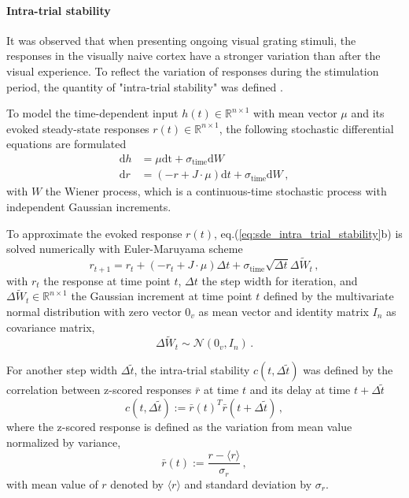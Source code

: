 \documentclass[11pt]{article}
\begin{document}
	\paragraph{Intra-trial stability}
	
	It was observed that when presenting ongoing visual grating stimuli, the responses in the visually naive cortex have a stronger variation than after the visual experience. To reflect the variation of responses during the stimulation period, the quantity of "intra-trial stability" was defined \cite{tragenap2023nature}. 
	
	To model the time-dependent input $h(t) \in \mathbb{R}^{n \times 1}$ with mean vector $\mu$ and its evoked steady-state responses $r(t) \in \mathbb{R}^{n \times 1}$, the following stochastic differential equations are formulated
		\begin{subequations} \label{eq:sde_intra_trial_stability}
			\begin{align}
				\mathrm{d} h & = \mu \mathrm{dt} + \sigma_{\text{time}} \mathrm{d} W \\
				\mathrm{d} r & = (-r + J \cdot \mu) \mathrm{d}t + \sigma_{\text{time}} \mathrm{d} W \, ,
			\end{align}
		\end{subequations}
	with $W$ the Wiener process, which is a continuous-time stochastic process with independent Gaussian increments. 
	
	To approximate the evoked response $r(t)$, eq.(\ref{eq:sde_intra_trial_stability}b) is solved numerically with Euler-Maruyama scheme 
		\begin{equation} \label{eq:euler_maruyama}
			r_{t+1} = r_t + (-r_t + J \cdot \mu) \Delta t + \sigma_{\text{time}} \sqrt{\Delta t} \Delta \tilde{W}_t \, ,
		\end{equation}
	with $r_t$ the response at time point $t$, $\Delta t$ the step width for iteration, and $\Delta \tilde{W}_t \in \mathbb{R}^{n \times 1}$ the Gaussian increment at time point $t$ defined by the multivariate normal distribution with zero vector $0_v$ as mean vector and identity matrix $I_n$ as covariance matrix, 
		\begin{equation}
			\Delta \tilde{W}_t \sim \mathcal{N}(0_v, I_n) \, .
		\end{equation}
	
	For another step width $\Delta \tilde{t}$, the intra-trial stability $c(t, \Delta \tilde{t})$ was defined by the correlation between z-scored responses $\bar{r}$ at time $t$ and its delay at time $t + \Delta \tilde{t}$ 
		\begin{equation}
			c(t, \Delta \tilde{t}) := \bar{r}(t)^T \bar{r}(t + \Delta \tilde{t}) \, , 
		\end{equation}
	where the z-scored response is defined as the variation from mean value normalized by variance, 
		\begin{equation}
			\bar{r}(t) := \frac{r - \langle r \rangle}{\sigma_r} \, ,
		\end{equation}
	with mean value of $r$ denoted by $\langle r \rangle$ and standard deviation by $\sigma_r$. 
	
\end{document}
